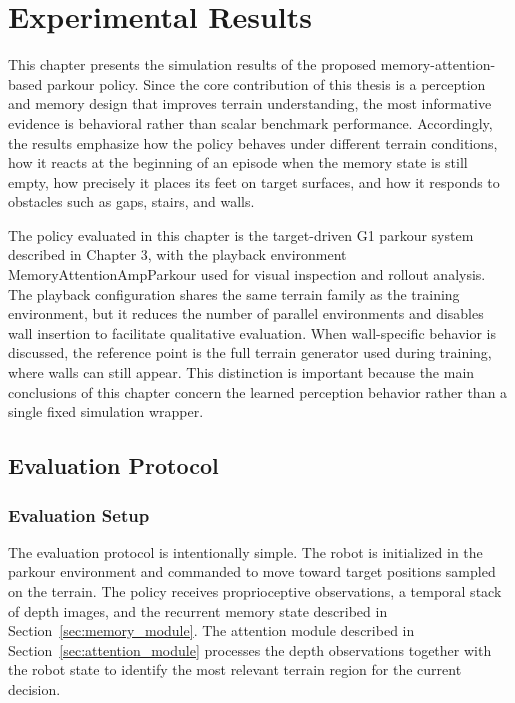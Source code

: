 \chapter{Experimental Results}
\label{chap:experimental_results}

This chapter presents the simulation results of the proposed memory-attention-based parkour policy. Since the core contribution of this thesis is a perception and memory design that improves terrain understanding, the most informative evidence is behavioral rather than scalar benchmark performance. Accordingly, the results emphasize how the policy behaves under different terrain conditions, how it reacts at the beginning of an episode when the memory state is still empty, how precisely it places its feet on target surfaces, and how it responds to obstacles such as gaps, stairs, and walls.

The policy evaluated in this chapter is the target-driven G1 parkour system described in Chapter 3, with the playback environment MemoryAttentionAmpParkour used for visual inspection and rollout analysis. The playback configuration shares the same terrain family as the training environment, but it reduces the number of parallel environments and disables wall insertion to facilitate qualitative evaluation. When wall-specific behavior is discussed, the reference point is the full terrain generator used during training, where walls can still appear. This distinction is important because the main conclusions of this chapter concern the learned perception behavior rather than a single fixed simulation wrapper.

\section{Evaluation Protocol}
\label{sec:evaluation_protocol}

\subsection{Evaluation Setup}
\label{sec:evaluation_setup}

The evaluation protocol is intentionally simple. The robot is initialized in the parkour environment and commanded to move toward target positions sampled on the terrain. The policy receives proprioceptive observations, a temporal stack of depth images, and the recurrent memory state described in Section~\ref{sec:memory_module}. The attention module described in Section~\ref{sec:attention_module} processes the depth observations together with the robot state to identify the most relevant terrain region for the current decision.

